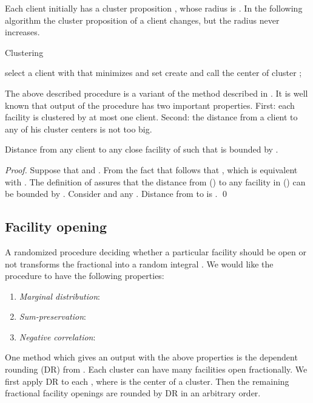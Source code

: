 \documentclass{llncs}
\begin{document}
Each client  initially has a cluster proposition , whose radius is . In the following algorithm the cluster proposition of a client  changes, but the radius never increases.
\begin{algorithm}
  \caption{Clustering}
\begin{algorithmic}[1]
 \FORALL{}
  \STATE 
 \ENDFOR
  \STATE select a client  with  that minimizes  and set 
  \FORALL{}
   \STATE 
   \STATE 
  \ENDFOR
  \STATE create  and call  the center of cluster ;
 \ENDWHILE
\end{algorithmic}
\end{algorithm}

The above described procedure is a variant of the method described in \cite{Chudak}. It is well known that output of the procedure has two important properties. First: each facility is clustered by at most one client. Second: the distance from a client to any of his cluster centers is not too big.

\begin{lemma}
\label{3hop_bound}
Distance from any client  to any close facility of  such that  is bounded by .
\end{lemma}

\begin{proof}
Suppose that  and . From the fact that  follows that , which is equivalent with . The definition of  assures that the distance from  () to any facility in  () can be bounded by  . Consider  and any . Distance from  to  is .
\qed
\end{proof}

\subsection{Facility opening}

A randomized procedure deciding whether a particular facility should be open or not transforms the fractional  into a random integral . 
We would like the procedure to have the following properties: 
\begin{enumerate}
 \item \emph{Marginal distribution}:
 \item \emph{Sum-preservation}:
 \item \emph{Negative correlation}:
\end{enumerate}

One method which gives an output with the above properties is the dependent rounding (DR) from \cite{Aravind}. 
Each cluster can have many facilities open fractionally. We first apply DR to each , where  is the center of a cluster. 
Then the remaining fractional facility openings are rounded by DR in an arbitrary order.
\end{document}
